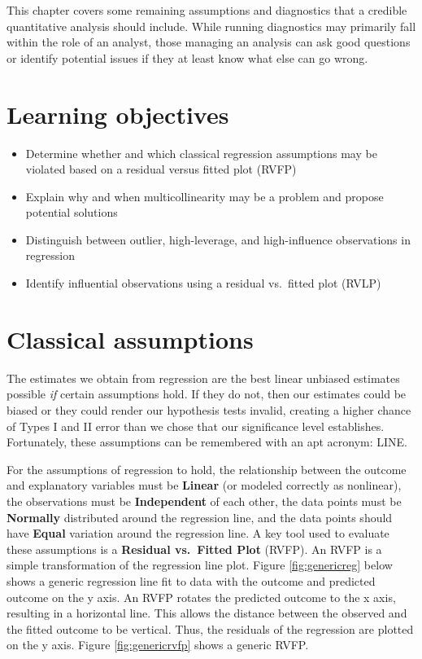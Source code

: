 \documentclass[
]{book}
\providecommand{\tightlist}{%
  \setlength{\itemsep}{0pt}\setlength{\parskip}{0pt}}
\begin{document}
This chapter covers some remaining assumptions and diagnostics that a credible quantitative analysis should include. While running diagnostics may primarily fall within the role of an analyst, those managing an analysis can ask good questions or identify potential issues if they at least know what else can go wrong.

\hypertarget{lo13}{%
\section{Learning objectives}\label{lo13}}

\begin{itemize}
\tightlist
\item
  Determine whether and which classical regression assumptions may be violated based on a residual versus fitted plot (RVFP)
\item
  Explain why and when multicollinearity may be a problem and propose potential solutions
\item
  Distinguish between outlier, high-leverage, and high-influence observations in regression
\item
  Identify influential observations using a residual vs.~fitted plot (RVLP)
\end{itemize}

\hypertarget{classical-assumptions}{%
\section{Classical assumptions}\label{classical-assumptions}}

The estimates we obtain from regression are the best linear unbiased estimates possible \emph{if} certain assumptions hold. If they do not, then our estimates could be biased or they could render our hypothesis tests invalid, creating a higher chance of Types I and II error than we chose that our significance level establishes. Fortunately, these assumptions can be remembered with an apt acronym: LINE.

For the assumptions of regression to hold, the relationship between the outcome and explanatory variables must be \textbf{Linear} (or modeled correctly as nonlinear), the observations must be \textbf{Independent} of each other, the data points must be \textbf{Normally} distributed around the regression line, and the data points should have \textbf{Equal} variation around the regression line. A key tool used to evaluate these assumptions is a \textbf{Residual vs.~Fitted Plot} (RVFP). An RVFP is a simple transformation of the regression line plot. Figure \ref{fig:genericreg} below shows a generic regression line fit to data with the outcome and predicted outcome on the y axis. An RVFP rotates the predicted outcome to the x axis, resulting in a horizontal line. This allows the distance between the observed and the fitted outcome to be vertical. Thus, the residuals of the regression are plotted on the y axis. Figure \ref{fig:genericrvfp} shows a generic RVFP.
\end{document}
